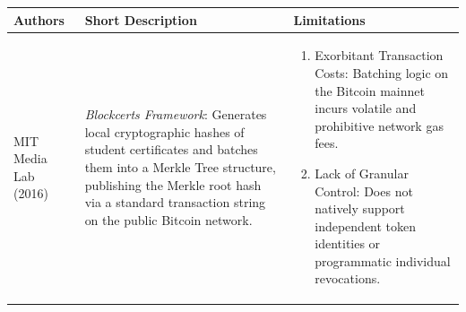 \begin{longtable}{|m{3.5cm}|m{5cm}|m{5.5cm}|}
    \hline
    \textbf{Authors}                                                                                                                                                                                                                                                       &
    \textbf{Short Description}                                                                                                                                                                                                                                             &
    \textbf{Limitations}                                                                                                                                                                                                                                                     \\
    \hline
    \endfirsthead

    MIT Media Lab (2016) \cite{mitlab2016blockcerts}                                                                                                                                                                                                                       &
    \textit{Blockcerts Framework}: Generates local cryptographic hashes of student certificates and batches them into a Merkle Tree structure, publishing the Merkle root hash via a standard transaction string on the public Bitcoin network.                            &

    \begin{enumerate}[nosep, leftmargin=*]
        \item Exorbitant Transaction Costs: Batching logic on the Bitcoin mainnet incurs volatile and prohibitive network gas fees.
        \item Lack of Granular Control: Does not natively support independent token identities or programmatic individual revocations.
    \end{enumerate}                                                                                                                                            \\
    \hline


\end{longtable}
